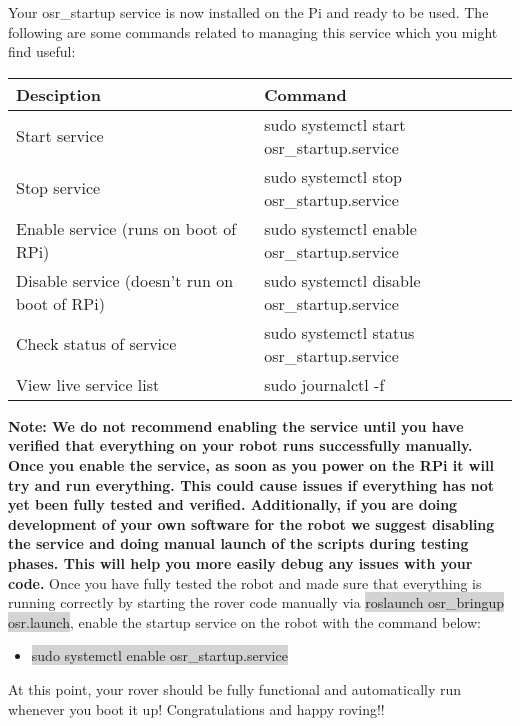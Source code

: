 \documentclass{article}
\begin{document}
\noindent Your osr\_startup service is now installed on the Pi and ready to be used. The following are some commands related to managing this service which you might find useful:

\begin{table}[H]
	\centering
		\begin{tabular}{| l | l |}
		\hline
		\textbf{Desciption} & \textbf{Command} \\ \hline
		Start service & sudo systemctl start osr\_startup.service \\ \hline
		Stop service & sudo systemctl stop osr\_startup.service \\ \hline
		Enable service (runs on boot of RPi) & sudo systemctl enable osr\_startup.service \\ \hline
		Disable service (doesn't run on boot of RPi) & sudo systemctl disable osr\_startup.service \\ \hline
		Check status of service & sudo systemctl status osr\_startup.service \\ \hline
		View live service list & sudo journalctl -f \\ \hline
		\end{tabular}
\end{table}

\textbf{Note: We do not recommend enabling the service until you have verified that everything on your robot runs successfully manually.  Once you enable the service, as soon as you power on the RPi it will try and run everything. This could cause issues if everything has not yet been fully tested and verified. Additionally, if you are doing development of your own software for the robot we suggest disabling the service and doing manual launch of the scripts during testing phases. This will help you more easily debug any issues with your code.} Once you have fully tested the robot and made sure that everything is running correctly by starting the rover code manually via \colorbox{lightgray}{roslaunch osr\_bringup osr.launch}, enable the startup service on the robot with the command below:

\begin{itemize}
	\item[] \colorbox{lightgray}{sudo systemctl enable osr\_startup.service}
\end{itemize}

At this point, your rover should be fully functional and automatically run whenever you boot it up!  Congratulations and happy roving!!
\end{document}
